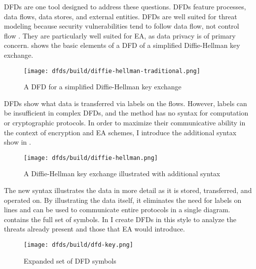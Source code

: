 \Acp{DFD} are one tool designed to address these questions. \Acp{DFD} feature processes, data flows, data stores, and
external entities. \Acp{DFD} are well suited for threat modeling because security vulnerabilities tend to follow data
flow, not control flow \cite{shostack_threat_2014}. They are particularly well suited for \ac{EA}, as data privacy is of
primary concern.  shows the basic elements of a \ac{DFD} of a simplified Diffie-Hellman
key exchange.

\begin{figure}[p]
    \centering\CaptionFontSize
    \texttt{[image: dfds/build/diffie-hellman-traditional.png]}
    \caption{A \acf{DFD} for a simplified Diffie-Hellman key exchange}
    \label{fig-dfd-dh-traditional}
\end{figure}

\Acp{DFD} show what data is transferred via labels on the flows. However, labels can be insufficient in complex
\acp{DFD}, and the method has no syntax for computation or cryptographic protocols. In order to maximize their
communicative ability in the context of encryption and \acl{EA} schemes, I introduce the additional syntax show in
.

\begin{figure}[p]
    \centering\CaptionFontSize
    \texttt{[image: dfds/build/diffie-hellman.png]}
    \caption{A Diffie-Hellman key exchange illustrated with additional syntax}
    \label{fig-dfd-dh-updated}
\end{figure}

The new syntax illustrates the data in more detail as it is stored, transferred, and operated on. By illustrating the
data itself, it eliminates the need for labels on lines and can be used to communicate entire protocols in a single
diagram.  contains the full set of symbols. In  I create \acp{DFD} in this
style to analyze the threats already present and those that \ac{EA} would introduce.

\begin{figure}[p]
    \centering\CaptionFontSize
    \texttt{[image: dfds/build/dfd-key.png]}
    \caption{Expanded set of DFD symbols}
    \label{fig-dfd-key}
\end{figure}
